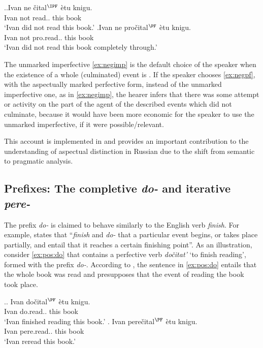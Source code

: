 \ex.\ag.\label{ex:negimp}Ivan ne \v{c}ital$^{\IPF}$ \`{e}tu knigu.\\
Ivan not read.. this book\\
\trans `Ivan did not read this book.'
\bg.\label{ex:negpf}Ivan ne pro\v{c}ital$^{\PF}$ \`{e}tu knigu.\\
Ivan not pro.read.. this book\\
\trans `Ivan did not read this book completely through.'\\

The unmarked imperfective \ref{ex:negimp} is the default choice of the speaker when the existence of a whole (culminated) event is .
If the speaker chooses \ref{ex:negpf}, with the aspectually marked perfective form, instead of the unmarked imperfective one, as in \ref{ex:negimp}, the hearer infers that there was some attempt or activity on the part of the agent of the described events which did not culminate, because it would have been more economic for the speaker to use the unmarked imperfective, if it were possible/relevant.

This account is implemented in  \citep{Blutner:00} and provides an important contribution to the understanding of aspectual distinction in Russian due to the shift from semantic  to pragmatic analysis.

\subsection{Prefixes: The completive \textit{do-} and iterative \textit{pere-}}\label{sec:pragm:old:pref}
The  prefix \textit{do-} is claimed to behave similarly to the English verb \textit{finish}. For example, \citet[75]{Kagan:book} states that ``\textit{finish} and \textit{do-}  that a particular event begins, or takes place partially, and entail that it reaches a certain finishing point''. As an illustration, consider \ref{ex:pos:do} that contains a perfective verb \textit{do\v{c}itat'} `to finish reading', formed with the  prefix \textit{do-}. According to \citet{Kagan:book}, the sentence in \ref{ex:pos:do} entails that the whole book was read and presupposes that the event of reading the book took place.

\ex.\ag. \label{ex:pos:do}Ivan do\v{c}ital$^{\PF}$ \`{e}tu knigu.\\
Ivan do.read.. this book\\
\trans `Ivan finished reading this book.'
\bg. \label{ex:pos:pere}Ivan pere\v{c}ital$^{\PF}$ \`{e}tu knigu.\\
Ivan pere.read.. this book\\
\trans `Ivan reread this book.'

